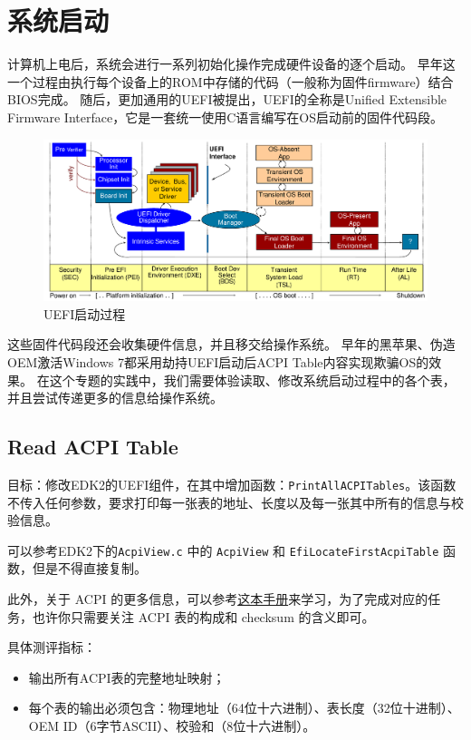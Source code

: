 \chapter{系统启动}
计算机上电后，系统会进行一系列初始化操作完成硬件设备的逐个启动。
早年这一个过程由执行每个设备上的ROM中存储的代码（一般称为固件firmware）结合BIOS完成。
随后，更加通用的UEFI被提出，UEFI的全称是Unified Extensible Firmware Interface，它是一套统一使用C语言编写在OS启动前的固件代码段。

\begin{figure}[h]
    \centering
    \includegraphics[width=\linewidth]{figure/mixed-figures/boot.pdf}
    \caption{UEFI启动过程}
    \label{fig:enter-label}
\end{figure}

这些固件代码段还会收集硬件信息，并且移交给操作系统。
早年的黑苹果、伪造OEM激活Windows 7都采用劫持UEFI启动后ACPI Table内容实现欺骗OS的效果。
在这个专题的实践中，我们需要体验读取、修改系统启动过程中的各个表，并且尝试传递更多的信息给操作系统。

\section{Read ACPI Table}
目标：修改EDK2的UEFI组件，在其中增加函数：\texttt{PrintAllACPITables}。该函数不传入任何参数，要求打印每一张表的地址、长度以及每一张其中所有的信息与校验信息。

可以参考EDK2下的\texttt{AcpiView.c} 中的 \texttt{AcpiView} 和 \texttt{EfiLocateFirstAcpiTable} 函数，但是不得直接复制。

此外，关于 ACPI 的更多信息，可以参考\href{https://uefi.org/sites/default/files/resources/ACPI_Spec_6.5a_Final.pdf}{这本手册}来学习，为了完成对应的任务，也许你只需要关注 ACPI 表的构成和 checksum 的含义即可。

具体测评指标：
\begin{itemize}
\item 输出所有ACPI表的完整地址映射；
\item 每个表的输出必须包含：物理地址（64位十六进制）、表长度（32位十进制）、OEM ID（6字节ASCII）、校验和（8位十六进制）。
\end{itemize}

